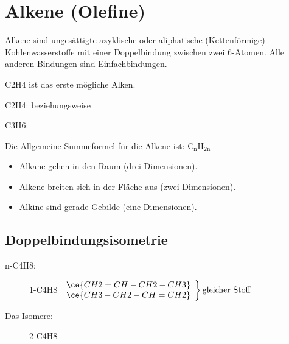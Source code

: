 \section{Alkene (Olefine)}
\label{sec:Alkene}
Alkene sind ungesättigte azyklische oder aliphatische (Kettenförmige) Kohlenwasserstoffe
mit einer Doppelbindung zwischen zwei \ac{6}-Atomen. Alle anderen Bindungen sind
Einfachbindungen.

\ac{C2H4} ist das erste mögliche Alken.

\ac{C2H4}:  beziehungsweise 

\ac{C3H6}: 

Die Allgemeine Summeformel für die Alkene ist: $\mathrm{C_nH_{2n}}$

\begin{itemize}
	\item Alkane gehen in den Raum (drei Dimensionen).
	\item Alkene breiten sich in der Fläche aus (zwei Dimensionen).
	\item Alkine sind gerade Gebilde (eine Dimensionen).
\end{itemize}

\subsection{Doppelbindungsisometrie}
\begin{description}
	\item[n-\acl{C4H8}:]  1-\acl{C4H8}\hspace{6ex}
		$\left.
		\begin{array}{cc}	%
			\ce{CH2=CH-CH2-CH3} \\
			\ce{CH3-CH2-CH=CH2}
		\end{array}
		\right\}
		\text{gleicher Stoff}$
	\item[Das Isomere:] 2-\acl{C4H8}\hspace{2.63ex} 
\end{description}



